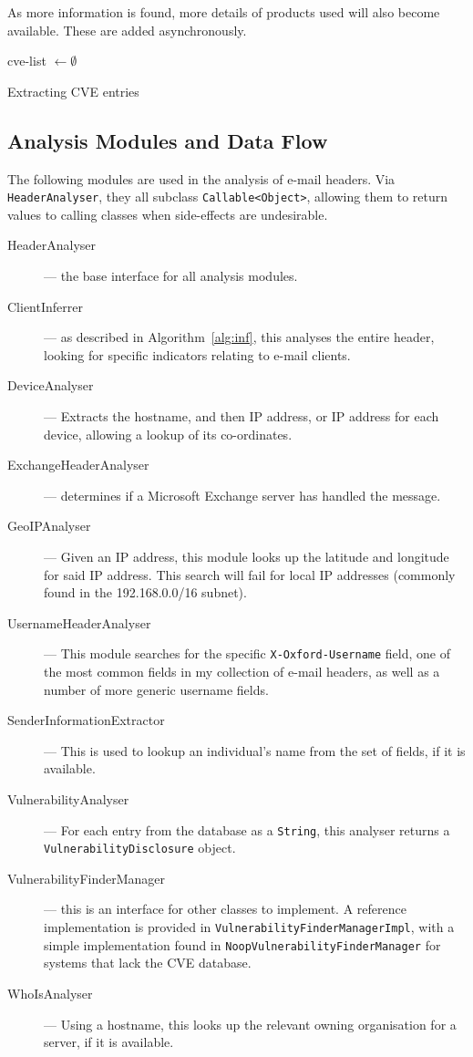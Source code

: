 As more information is found, more details of products used will also become
available.  These are added asynchronously.

\begin{algorithm}
	cve-list $\gets\emptyset$\;
	\;
	\caption{Extracting CVE entries}
\end{algorithm}

\subsection{Analysis Modules and Data Flow}

The following modules are used in the analysis of e-mail headers. Via
\texttt{HeaderAnalyser}, they all subclass \texttt{Callable<Object>}, allowing
them to return values to calling classes when side-effects are undesirable.

\begin{description}
	\item[HeaderAnalyser] --- the base interface for all analysis modules.
	\item[ClientInferrer] --- as described in Algorithm~\ref{alg:inf}, this analyses the entire header, looking for specific indicators relating to e-mail clients.
	\item[DeviceAnalyser] --- Extracts the hostname, and then IP address, or IP address for each device, allowing a lookup of its co-ordinates.
	\item[ExchangeHeaderAnalyser] --- determines if a Microsoft Exchange server has handled the message.
	\item[GeoIPAnalyser] --- Given an IP address, this module looks up the latitude and longitude for said IP address.  This search will fail for local IP addresses (commonly found in the 192.168.0.0/16 subnet).
	\item[UsernameHeaderAnalyser] --- This module searches for the specific \texttt{X-Oxford-Username} field, one of the most common fields in my collection of e-mail headers, as well as a number of more generic username fields.
	\item[SenderInformationExtractor] --- This is used to lookup an individual's name from the set of fields, if it is available.
	\item[VulnerabilityAnalyser] --- For each entry from the database as a \texttt{String}, this analyser returns a \texttt{VulnerabilityDisclosure} object.
	\item[VulnerabilityFinderManager] --- this is an interface for other classes to implement. A reference implementation is provided in \texttt{VulnerabilityFinderManagerImpl}, with a simple implementation found in \texttt{NoopVulnerabilityFinderManager} for systems that lack the CVE database.
	\item[WhoIsAnalyser] --- Using a hostname, this looks up the relevant owning organisation for a server, if it is available.
\end{description}

